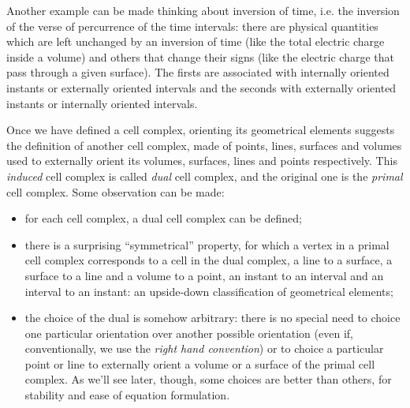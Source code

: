 
Another example can be made thinking about inversion of time,
i.e. the inversion of the verse of percurrence of the time intervals:
there are physical quantities which are left unchanged by an inversion
of time (like the total electric charge inside a volume) and others
that change their signs (like the electric charge that pass through a
given surface). The firsts are associated with internally oriented
instants or externally oriented intervals and the seconds with
externally oriented instants or internally oriented intervals.


Once we have defined a cell complex, orienting its geometrical
elements suggests the definition of another cell complex, made of
points, lines, surfaces and volumes used to externally orient its
volumes, surfaces, lines and points respectively. This \emph{induced}
cell complex is called \emph{dual} cell complex, and the original one
is the \emph{primal} cell complex. Some observation can be made:
\begin{itemize}
\item
  for each cell complex, a dual cell complex can be defined;
\item
  there is a surprising ``symmetrical'' property, for which a vertex
  in a primal cell complex corresponds to a cell in the dual complex, a
  line to a surface, a surface to a line and a volume to a point, an
  instant to an interval and an interval to an instant: an upside-down
  classification of geometrical elements;
\item
  the choice of the dual is somehow arbitrary: there is no special
  need to choice one particular orientation over another possible
  orientation (even if, conventionally, we use the \emph{right hand
  convention}) or to choice a particular point or line to externally
  orient a volume or a surface of the primal cell complex. As we'll
  see later, though, some choices are better than others, for
  stability and ease of equation formulation.
\end{itemize}

